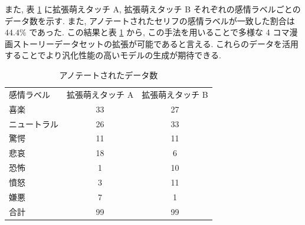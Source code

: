\begin{table}[!h]
\vspace{5mm}
\caption{アノテートされたセリフと感情ラベルの例}
\label{table:aug_data}
\centering
{}
\vspace{1mm}
\end{table}

\newpage
また, 表 \ref{table:data_moe_aug} に拡張萌えタッチ A, 拡張萌えタッチ B それぞれの感情ラベルごとのデータ数を示す. また, アノテートされたセリフの感情ラベルが一致した割合は $44.4 \%$ であった. この結果と表 \ref{table:data_moe_aug} から, この手法を用いることで多様な 4 コマ漫画ストーリーデータセットの拡張が可能であると言える. これらのデータを活用することでより汎化性能の高いモデルの生成が期待できる.


\begin{table}[!h]
\vspace{20mm}
\begin{center}
\caption{アノテートされたデータ数} %
\label{table:data_moe_aug} %
\begin{tabular}{lcc}
\hline
\multirow{2}{*}{感情ラベル} & \multirow{2}{*}{拡張萌えタッチ A} & \multirow{2}{*}{拡張萌えタッチ B} \\
 &  &  \\ \hline
喜楽 & 33 & 27 \\ \hline
ニュートラル & 26 & 33 \\
驚愕 & 11 & 11 \\
悲哀 & 18 & 6 \\
恐怖 & 1 & 10 \\
憤怒 & 3 & 11 \\
嫌悪 & 7 & 1 \\ \hline
合計 & 99 & 99
\end{tabular}
\end{center}
\vspace{10mm}
\end{table}

